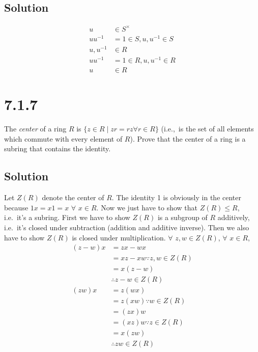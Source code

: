 \documentclass[fleqn]{article}
\begin{document}
        \subsection{Solution}
        \begin{align}
            u &\in S^\times \\
            u u^{-1} &= 1 \in S, u, u^{-1} \in S \\
            u, u^{-1} &\in R \\
            u u^{-1} &= 1 \in R, u, u^{-1} \in R \\
            u &\in R
        \end{align}
    
    \section{7.1.7}
    The \textit{center} of a ring $R$ is $\{z \in R \mid zr = rz \forall r \in R\}$ (i.e.,\ is the set of all elements which commute with every element of $R$).  Prove that the center of a ring is a subring that contains the identity.
        
        \subsection{Solution}
        Let $Z(R)$ denote the center of $R$.  The identity 1 is obviously in the center because $1x = x1 = x$ $\forall$ $x \in R$.  Now we just have to show that $Z(R) \leq R$, i.e.\ it's a subring.  First we have to show $Z(R)$ is a subgroup of $R$ additively, i.e.\ it's closed under subtraction (addition and additive inverse).  Then we also have to show $Z(R)$ is closed under multiplication.  $\forall$ $z, w \in Z(R)$, $\forall$ $x \in R$,
        \begin{align}
            (z - w)x &= zx - wx \\
                &= xz - xw \because{} z, w \in Z(R) \\
                &= x(z - w) \\
            &\therefore{} z - w \in Z(R) \\
            (zw)x &= z(wx) \\
                &= z(xw) \because{} w \in Z(R) \\
                &= (zx)w \\
                &= (xz)w \because{} z \in Z(R) \\
                &= x(zw) \\
            &\therefore{} zw \in Z(R) \\
        \end{align}
    
\end{document}
